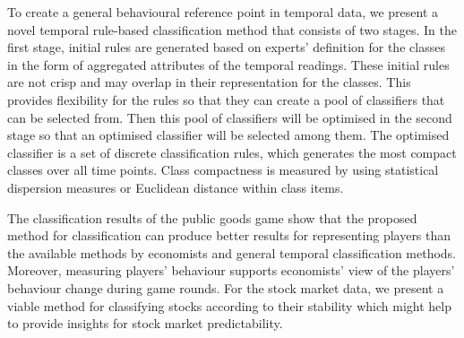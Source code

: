 To create a general behavioural reference point in temporal data, we present a novel temporal rule-based classification method that consists of two stages. In the first stage, initial rules are generated based on experts' definition for the classes in the form of aggregated attributes of the temporal readings. These initial rules are not crisp and may overlap in their representation for the classes. This provides flexibility for the rules so that they can create a pool of classifiers that can be selected from. Then this pool of classifiers will be optimised in the second stage so that an optimised classifier will be selected among them. The optimised classifier is a set of discrete classification rules, which generates the most compact classes over all time points. Class compactness is measured by using statistical dispersion measures or Euclidean distance within class items.

The classification results of the public goods game show that the proposed method for classification can produce better results for representing players than the available methods by economists and general temporal classification methods. Moreover, measuring players' behaviour supports economists' view of the players' behaviour change during game rounds. For the stock market data, we present a viable method for classifying stocks according to their stability which might help to provide insights for stock market predictability.